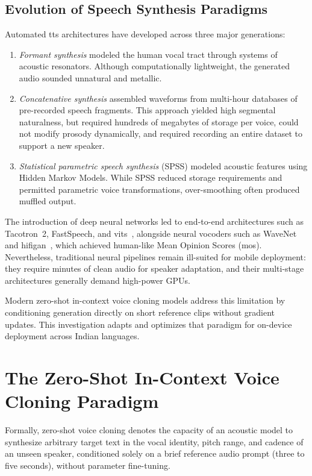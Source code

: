\subsection{Evolution of Speech Synthesis Paradigms}
Automated \gls{tts} architectures have developed across three major generations:
\begin{enumerate}
    \item \textit{Formant synthesis} modeled the human vocal tract through systems of acoustic resonators. Although computationally lightweight, the generated audio sounded unnatural and metallic.
    \item \textit{Concatenative synthesis} assembled waveforms from multi-hour databases of pre-recorded speech fragments. This approach yielded high segmental naturalness, but required hundreds of megabytes of storage per voice, could not modify prosody dynamically, and required recording an entire dataset to support a new speaker.
    \item \textit{Statistical parametric speech synthesis} (SPSS) modeled acoustic features using Hidden Markov Models. While SPSS reduced storage requirements and permitted parametric voice transformations, over-smoothing often produced muffled output.
\end{enumerate}

The introduction of deep neural networks led to end-to-end architectures such as Tacotron~2, FastSpeech, and \gls{vits}~\cite{kim2021vits}, alongside neural vocoders such as WaveNet and \gls{hifigan}~\cite{kong2020hifigan}, which achieved human-like Mean Opinion Scores (\acrshort{mos}). Nevertheless, traditional neural pipelines remain ill-suited for mobile deployment: they require minutes of clean audio for speaker adaptation, and their multi-stage architectures generally demand high-power GPUs.

Modern zero-shot in-context voice cloning models address this limitation by conditioning generation directly on short reference clips without gradient updates. This investigation adapts and optimizes that paradigm for on-device deployment across Indian languages.

\section{The Zero-Shot In-Context Voice Cloning Paradigm}
Formally, zero-shot voice cloning denotes the capacity of an acoustic model to synthesize arbitrary target text in the vocal identity, pitch range, and cadence of an unseen speaker, conditioned solely on a brief reference audio prompt (three to five seconds), without parameter fine-tuning.

